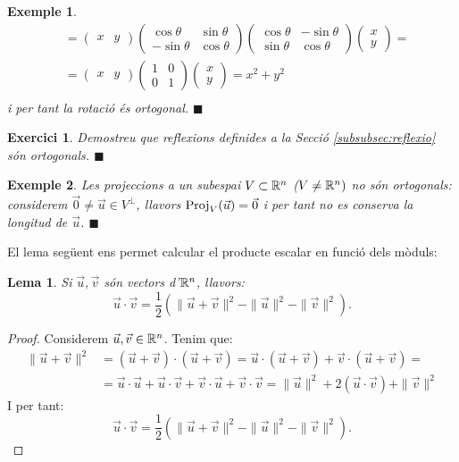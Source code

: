 \documentclass[
  11pt,
]{book}
\numberwithin{dummy}{section}
\theoremstyle{maincolornumbox}
\newtheorem{exerciseT}{Exercici}[chapter]
\theoremstyle{blacknumex}
\newtheorem{exampleT}{Exemple}[chapter]
\theoremstyle{blacknumbox}
\theoremstyle{maincolornum}
\newtheorem{lemmaT}{Lema}[chapter]
\newenvironment{lemma}{\begin{pBox}\begin{lemmaT}}{\end{lemmaT}\end{pBox}}
\newenvironment{exercise}{\begin{eBox}\begin{exerciseT}}{\hfill{\color{maincolor}\tiny\ensuremath{\blacksquare}}\end{exerciseT}\end{eBox}}
\newenvironment{example}{\begin{exampleT}}{\hfill{\tiny\ensuremath{\blacksquare}}\end{exampleT}}
\newlength\esp
\begin{document}
\begin{example}
\begin{align*}
& = \begin{pmatrix}x &  y \end{pmatrix}
\begin{pmatrix}
\cos\theta&\sin\theta\\
-\sin\theta&\cos\theta
\end{pmatrix}
\begin{pmatrix}
\cos\theta&-\sin\theta\\
\sin\theta&\cos\theta
\end{pmatrix}
\begin{pmatrix}x \\ y \end{pmatrix} = \\
& = \begin{pmatrix}x &  y \end{pmatrix}
\begin{pmatrix}
1&0\\
0&1
\end{pmatrix}
\begin{pmatrix}x \\ y \end{pmatrix} = x^2+y^2\\
\end{align*} i per tant la rotació és ortogonal.
\end{example}

\begin{exercise}
Demostreu que reflexions definides a la Secció
\ref{subsubsec:reflexio} són ortogonals.
\end{exercise}

\begin{example}
Les projeccions a un subespai \(V\subset \mathbb{R}^n\) (\(V\neq \mathbb{R}^n)\) no són
ortogonals: considerem \(\vec 0 \neq \vec u \in V^\perp\), llavors
\(\operatorname{Proj}_V(\vec u)=\vec 0\) i per tant no es conserva la longitud de
\(\vec u\).
\end{example}

El lema següent ens permet calcular el producte escalar en funció dels
mòduls:

\begin{lemma}
\protect\hypertarget{lem:prod-esc-modul}{}\label{lem:prod-esc-modul}Si \(\vec u, \vec v\)
són vectors d'\(\mathbb{R}^n\), llavors:
\[\vec u \cdot \vec v = \frac{1}{2}\left(\|\vec u + \vec v\|^2 - \|\vec u\|^2 - \|\vec v\|^2\right).\]
\end{lemma}

\begin{proof}
Considerem \(\vec u, \vec v \in \mathbb{R}^n\). Tenim que:
\begin{align*}
\|\vec u + \vec v\|^2 & =(\vec u+\vec v)\cdot(\vec u+\vec v) = \vec u \cdot (\vec u+ \vec v) + \vec v \cdot (\vec u+ \vec v) = \\
 & = \vec u \cdot \vec u  + \vec u \cdot \vec v + \vec v \cdot \vec u+\vec v \cdot \vec v = \|\vec u\|^2+2 (\vec u \cdot \vec v) + \|\vec v\|^2
\end{align*} I per tant:
\[\vec u \cdot \vec v = \frac{1}{2}\left(\|\vec u + \vec v\|^2 - \|\vec u\|^2 - \|\vec v\|^2\right).\]
\end{proof}
\end{document}
